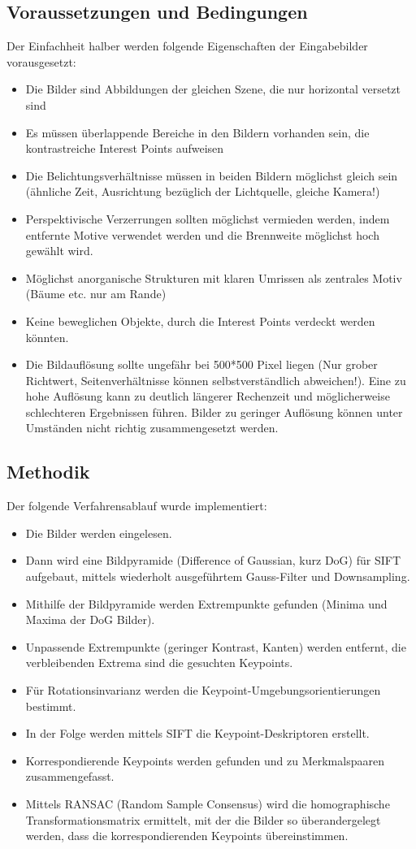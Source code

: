 \documentclass[deutsch]{scrartcl}
\begin{document}
\subsection{Voraussetzungen und Bedingungen}
Der Einfachheit halber werden folgende Eigenschaften der Eingabebilder vorausgesetzt:
\begin{itemize}
	\item Die Bilder sind Abbildungen der gleichen Szene, die nur horizontal versetzt sind
	\item Es müssen überlappende Bereiche in den Bildern vorhanden sein, die kontrastreiche Interest Points aufweisen
	\item Die Belichtungsverhältnisse müssen in beiden Bildern möglichst gleich sein (ähnliche Zeit, Ausrichtung bezüglich der Lichtquelle, gleiche Kamera!)
	\item Perspektivische Verzerrungen sollten möglichst vermieden werden, indem entfernte Motive verwendet werden und die Brennweite möglichst hoch gewählt wird.
	\item Möglichst anorganische Strukturen mit klaren Umrissen als zentrales Motiv (Bäume etc. nur am Rande)
	\item Keine beweglichen Objekte, durch die Interest Points verdeckt werden könnten.
	\item Die Bildauflösung sollte ungefähr bei 500*500 Pixel liegen (Nur grober Richtwert, Seitenverhältnisse können selbstverständlich abweichen!). Eine zu hohe Auflösung kann zu deutlich längerer Rechenzeit und möglicherweise schlechteren Ergebnissen führen. Bilder zu geringer Auflösung können unter Umständen nicht richtig zusammengesetzt werden.
\end{itemize}

\subsection{Methodik}
Der folgende Verfahrensablauf wurde implementiert:
\begin{itemize}
	\item Die Bilder werden eingelesen.
	\item Dann wird eine Bildpyramide (Difference of Gaussian, kurz DoG) für SIFT aufgebaut, mittels wiederholt ausgeführtem Gauss-Filter und Downsampling.
	\item Mithilfe der Bildpyramide werden Extrempunkte gefunden (Minima und Maxima der DoG Bilder).
	\item Unpassende Extrempunkte (geringer Kontrast, Kanten) werden entfernt, die verbleibenden Extrema sind die gesuchten Keypoints.
	\item Für Rotationsinvarianz werden die Keypoint-Umgebungsorientierungen bestimmt.
	\item In der Folge werden mittels SIFT die Keypoint-Deskriptoren erstellt.
	\item Korrespondierende Keypoints werden gefunden und zu Merkmalspaaren zusammengefasst.
	\item Mittels RANSAC (Random Sample Consensus) wird die homographische Transformationsmatrix ermittelt, mit der die Bilder so überandergelegt werden, dass die korrespondierenden Keypoints übereinstimmen.
\end{itemize}
\end{document}
